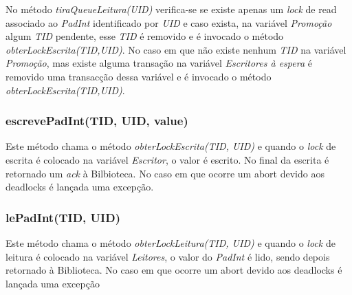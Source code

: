No método \textit{tiraQueueLeitura(UID)} verifica-se se existe apenas um \textit{lock} de read associado ao \textit{PadInt} identificado por \textit{UID} e caso exista, na variável \textit{Promoção} algum \textit{TID} pendente, esse \textit{TID} é removido e é invocado o método \textit{obterLockEscrita(TID,UID)}. No caso em que não existe nenhum \textit{TID} na variável \textit{Promoção}, mas existe alguma transação na variável \textit{Escritores à espera} é removido uma transacção dessa variável e é invocado o método \textit{obterLockEscrita(TID,UID)}.

\subsubsection{escrevePadInt(TID, UID, value)}

Este método chama o método \textit{obterLockEscrita(TID, UID)} e quando o \textit{lock} de escrita é colocado na variável \textit{Escritor}, o valor é escrito. No final da escrita é retornado um \textit{ack} à Bilbioteca. No caso em que ocorre um abort devido aos deadlocks é lançada uma excepção.

\subsubsection{lePadInt(TID, UID)}

Este método chama o método \textit{obterLockLeitura(TID, UID)} e quando o \textit{lock} de leitura é colocado na variável \textit{Leitores}, o valor do \textit{PadInt} é lido, sendo depois retornado à Biblioteca. No caso em que ocorre um abort devido aos deadlocks é lançada uma excepção
